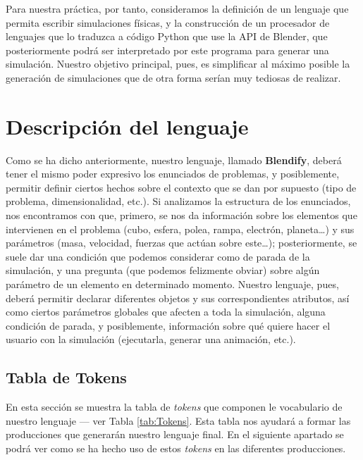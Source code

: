 \documentclass[12pt]{article}
\begin{document}
Para nuestra práctica, por tanto, consideramos la definición de un lenguaje que permita escribir simulaciones físicas, y la construcción de un procesador de lenguajes que lo traduzca a código Python que use la API de Blender, que posteriormente podrá ser interpretado por este programa para generar una simulación. Nuestro objetivo principal, pues, es simplificar al máximo posible la generación de simulaciones que de otra forma serían muy tediosas de realizar.

\section{Descripción del lenguaje}

Como se ha dicho anteriormente, nuestro lenguaje, llamado \textbf{Blendify}, deberá tener el mismo poder expresivo los enunciados de problemas, y posiblemente, permitir definir ciertos hechos sobre el contexto que se dan por supuesto (tipo de problema, dimensionalidad, etc.). Si analizamos la estructura de los enunciados, nos encontramos con que, primero, se nos da información sobre los elementos que intervienen en el problema (cubo, esfera, polea, rampa, electrón, planeta…) y sus parámetros (masa, velocidad, fuerzas que actúan sobre este…); posteriormente, se suele dar una condición que podemos considerar como de parada de la simulación, y una pregunta (que podemos felizmente obviar) sobre algún parámetro de un elemento en determinado momento. Nuestro lenguaje, pues, deberá permitir declarar diferentes objetos y sus correspondientes atributos, así como ciertos parámetros globales que afecten a toda la simulación, alguna condición de parada, y posiblemente, información sobre qué quiere hacer el usuario con la simulación (ejecutarla, generar una animación, etc.).

\subsection{Tabla de Tokens}

En esta sección se muestra la tabla de \textit{tokens} que componen le vocabulario de nuestro lenguaje ---  ver Tabla \ref{tab:Tokens}. Esta tabla nos ayudará a formar las producciones que generarán nuestro lenguaje final. En el siguiente apartado se podrá ver como se ha hecho uso de estos \textit{tokens} en las diferentes producciones.
\end{document}
